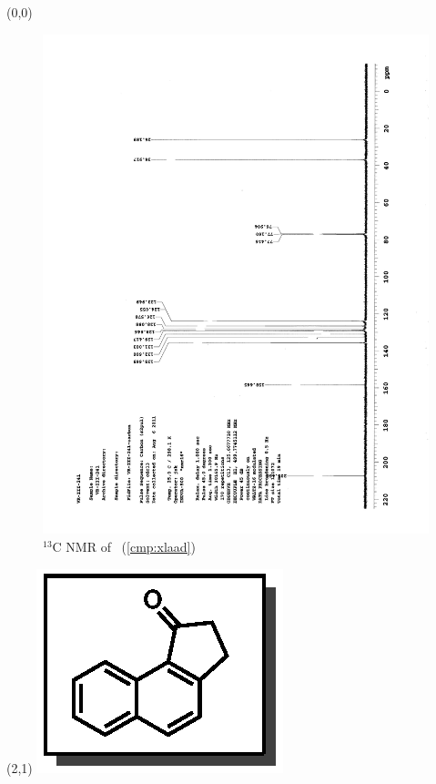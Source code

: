 \clearpage
\begin{textblock}{20}(0,0)
\begin{figure}[htb]
\caption{$^{13}$C NMR of  \CMPxlaad\ (\ref{cmp:xlaad})}
\includegraphics[scale=0.75, trim = 0mm 0mm 0mm 5mm,
clip]{chp_asymmetric/images/nmr/xlaadC}
\vspace{-100pt}
\end{figure}
\end{textblock}
\begin{textblock}{1}(2,1)
\includegraphics[scale=0.8, angle=90]{chp_asymmetric/images/xlaad}
\end{textblock}
\clearpage

